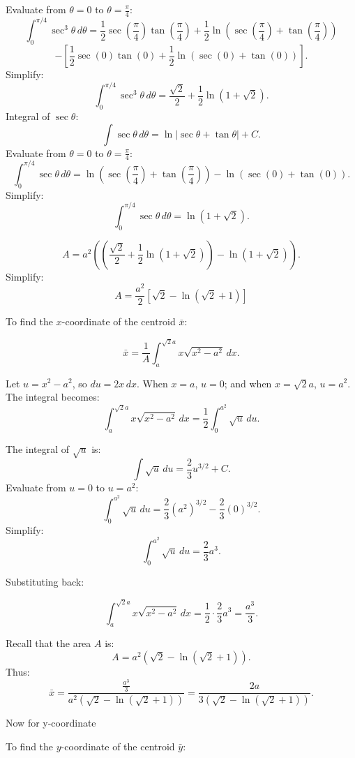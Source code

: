 \documentclass[12pt]{article}
\begin{document}
\begin{enumerate}
\begin{enumerate}
Evaluate from \( \theta = 0 \) to \( \theta = \frac{\pi}{4} \):
\[
\int_0^{\pi/4} \sec^3\theta \, d\theta = \frac{1}{2} \sec\left(\frac{\pi}{4}\right) \tan\left(\frac{\pi}{4}\right) + \frac{1}{2} \ln\left(\sec\left(\frac{\pi}{4}\right) + \tan\left(\frac{\pi}{4}\right)\right)
\]
\[
-\left[ \frac{1}{2} \sec(0) \tan(0) + \frac{1}{2} \ln\left(\sec(0) + \tan(0)\right) \right].
\]
Simplify:
\[
\int_0^{\pi/4} \sec^3\theta \, d\theta = \frac{\sqrt{2}}{2} + \frac{1}{2} \ln\left(1 + \sqrt{2}\right).
\]
Integral of $\sec \theta$:
\[
\int \sec\theta \, d\theta = \ln|\sec\theta + \tan\theta| + C.
\]
Evaluate from \( \theta = 0 \) to \( \theta = \frac{\pi}{4} \):
\[
\int_0^{\pi/4} \sec\theta \, d\theta = \ln\left(\sec\left(\frac{\pi}{4}\right) + \tan\left(\frac{\pi}{4}\right)\right) - \ln\left(\sec(0) + \tan(0)\right).
\]
Simplify:
\[
\int_0^{\pi/4} \sec\theta \, d\theta = \ln\left(1 + \sqrt{2}\right).
\]

\[
A = a^2 \left( \left( \frac{\sqrt{2}}{2} + \frac{1}{2} \ln(1 + \sqrt{2}) \right) - \ln(1 + \sqrt{2}) \right).
\]
Simplify:
\[
A = \frac{a^2}{2}[\sqrt{2} - \ln(\sqrt{2} + 1)]
\]

To find the \( x \)-coordinate of the centroid \( \bar{x} \):

\[
\bar{x} = \frac{1}{A} \int_a^{\sqrt{2}a} x \sqrt{x^2 - a^2} \, dx.
\]

Let \( u = x^2 - a^2 \), so \( du = 2x \, dx \). When \( x = a \), \( u = 0 \); and when \( x = \sqrt{2}a \), \( u = a^2 \). The integral becomes:
\[
\int_a^{\sqrt{2}a} x \sqrt{x^2 - a^2} \, dx = \frac{1}{2} \int_0^{a^2} \sqrt{u} \, du.
\]



The integral of \( \sqrt{u} \) is:
\[
\int \sqrt{u} \, du = \frac{2}{3} u^{3/2} + C.
\]
Evaluate from \( u = 0 \) to \( u = a^2 \):
\[
\int_0^{a^2} \sqrt{u} \, du = \frac{2}{3} (a^2)^{3/2} - \frac{2}{3}(0)^{3/2}.
\]
Simplify:
\[
\int_0^{a^2} \sqrt{u} \, du = \frac{2}{3} a^3.
\]

Substituting back:

\[
\int_a^{\sqrt{2}a} x \sqrt{x^2 - a^2} \, dx = \frac{1}{2} \cdot \frac{2}{3} a^3 = \frac{a^3}{3}.
\]

Recall that the area \( A \) is:
\[
A = a^2 \left( \sqrt{2} - \ln(\sqrt{2} + 1) \right).
\]
Thus:
\[
\bar{x} = \frac{\frac{a^3}{3}}{a^2 \left( \sqrt{2} - \ln(\sqrt{2} + 1) \right)} = \frac{2a}{3 \left( \sqrt{2} - \ln(\sqrt{2} + 1) \right)}.
\]


Now for y-coordinate

To find the \( y \)-coordinate of the centroid \( \bar{y} \):


\end{enumerate}
\end{enumerate}
\end{document}
